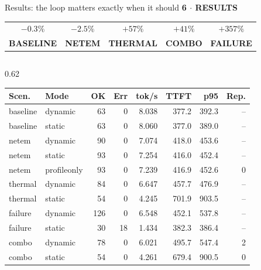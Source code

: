 \documentclass[aspectratio=169,9pt]{beamer}
\newcommand{\kicker}[1]{{\scriptsize\color{keBlue}\bfseries\MakeUppercase{#1}}\par\vspace{0.2em}}
\newcommand{\bad}[1]{{\color{keRed}#1}}
\begin{document}
\begin{frame}[shrink=25]{Results: the loop matters exactly when it should}
  \kicker{6 $\cdot$ Results}
  \centering\scriptsize
  \begin{tabular}{@{}ccccc@{}}
    {\Large\color{keMuted}$-0.3\%$} & {\Large\color{keMuted}$-2.5\%$} &
    {\Large\color{keGreen}$+57\%$}  & {\Large\color{keGreen}$+41\%$} &
    {\Large\color{keGreen}$+357\%$} \\
    \textbf{BASELINE} & \textbf{NETEM} & \textbf{THERMAL} & \textbf{COMBO} &
    \textbf{FAILURE} \\
  \end{tabular}
  \vspace{0.7em}

  \begin{columns}[T]
    \begin{column}{0.62\textwidth}
      \centering\scriptsize
      \renewcommand{\arraystretch}{1.08}
      \begin{tabular}{@{}llrrrrrr@{}}
        \toprule
        \color{keNavy}\bfseries Scen. & \color{keNavy}\bfseries Mode &
        \color{keNavy}\bfseries OK & \color{keNavy}\bfseries Err &
        \color{keNavy}\bfseries tok/s & \color{keNavy}\bfseries TTFT &
        \color{keNavy}\bfseries p95 & \color{keNavy}\bfseries Rep. \\
        \midrule
        baseline & dynamic     & 63  & 0        & 8.038 & 377.2 & 392.3 & -- \\
        baseline & static      & 63  & 0        & 8.060 & 377.0 & 389.0 & -- \\
        netem    & dynamic     & 90  & 0        & 7.074 & 418.0 & 453.6 & -- \\
        netem    & static      & 93  & 0        & 7.254 & 416.0 & 452.4 & -- \\
        netem    & profileonly & 93  & 0        & 7.239 & 416.9 & 452.6 & 0 \\
        thermal  & dynamic     & 84  & 0        & 6.647 & 457.7 & 476.9 & -- \\
        thermal  & static      & 54  & 0        & 4.245 & 701.9 & 903.5 & -- \\
        failure  & dynamic     & 126 & 0        & 6.548 & 452.1 & 537.8 & -- \\
        failure  & static      & 30  & \bad{18} & 1.434 & 382.3 & 386.4 & -- \\
        combo    & dynamic     & 78  & 0        & 6.021 & 495.7 & 547.4 & 2 \\
        combo    & static      & 54  & 0        & 4.261 & 679.4 & 900.5 & 0 \\

\end{tabular}
\end{column}
\end{columns}
\end{frame}
\end{document}
